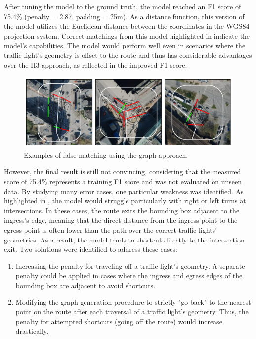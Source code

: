 After tuning the model to the ground truth, the model reached an F1 score of 75.4\% (penalty = 2.87, padding = 25m). As a distance function, this version of the model utilizes the Euclidean distance between the coordinates in the WGS84 projection system. Correct matchings from this model highlighted in  indicate the model's capabilities. The model would perform well even in scenarios where the traffic light's geometry is offset to the route and thus has considerable advantages over the H3 approach, as reflected in the improved F1 score.

\begin{figure}[t]
\centering
\includegraphics[width=\linewidth]{images/matching-dijkstra-incorrect.pdf}
\caption{Examples of false matching using the graph approach.}
\label{fig:sg-selection-graph-fails}
\end{figure}

However, the final result is still not convincing, considering that the measured score of 75.4\% represents a training F1 score and was not evaluated on unseen data. By studying many error cases, one particular weakness was identified. As highlighted in , the model would struggle particularly with right or left turns at intersections. In these cases, the route exits the bounding box adjacent to the ingress's edge, meaning that the direct distance from the ingress point to the egress point is often lower than the path over the correct traffic lights' geometries. As a result, the model tends to shortcut directly to the intersection exit. Two solutions were identified to address these cases:

\begin{enumerate}
    \item Increasing the penalty for traveling off a traffic light's geometry. A separate penalty could be applied in cases where the ingress and egress edges of the bounding box are adjacent to avoid shortcuts.
    \item  Modifying the graph generation procedure to strictly "go back" to the nearest point on the route after each traversal of a traffic light's geometry. Thus, the penalty for attempted shortcuts (going off the route) would increase drastically.
\end{enumerate}

